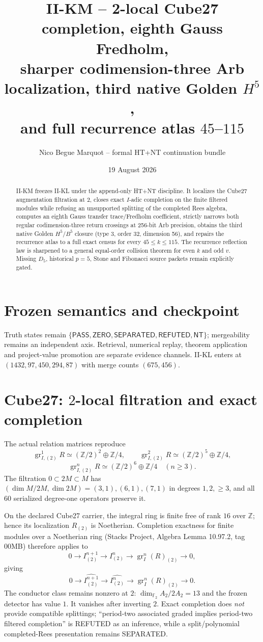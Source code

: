 \documentclass[9.5pt,a4paper]{article}
\title{\textbf{II-KM -- 2-local Cube27 completion, eighth Gauss Fredholm,}\\\textbf{sharper codimension-three Arb localization, third native Golden $H^5$,}\\\textbf{and full recurrence atlas $45$--$115$}}
\author{Nico Begue Marquot -- formal HT+NT continuation bundle}\date{19 August 2026}
\newcommand{\PASS}{\textsf{PASS}}\newcommand{\ZERO}{\textsf{ZERO}}\newcommand{\SEP}{\textsf{SEPARATED}}\newcommand{\REF}{\textsf{REFUTED}}\newcommand{\NT}{\textsf{NT}}
\begin{document}
\maketitle\vspace{-1.25em}
\begin{abstract}\small
II-KM freezes II-KL under the append-only HT+NT discipline.  It localizes the Cube27 augmentation filtration at $2$, closes exact $I$-adic completion on the finite filtered modules while refusing an unsupported splitting of the completed Rees algebra, computes an eighth Gauss transfer trace/Fredholm coefficient, strictly narrows both regular codimension-three return crossings at 256-bit Arb precision, obtains the third native Golden $H^5/B^5$ closure (type 3, order 32, dimension 56), and repairs the recurrence atlas to a full exact census for every $45\le k\le115$.  The recurrence reflection law is sharpened to a general equal-order collision theorem for even $k$ and odd $v$.  Missing $D_5$, historical $p=5$, Stone and Fibonacci source packets remain explicitly gated.
\end{abstract}
\section{Frozen semantics and checkpoint}
Truth states remain $\{\PASS,\ZERO,\SEP,\REF,\NT\}$; mergeability remains an independent axis.  Retrieval, numerical replay, theorem application and project-value promotion are separate evidence channels.  II-KL enters at $(1432,97,450,294,87)$ with merge counts $(675,456)$.

\section{Cube27: $2$-local filtration and exact completion}
The actual relation matrices reproduce
\[
\operatorname{gr}^1_{I,(2)}R\simeq(\mathbb Z/2)^2\oplus\mathbb Z/4,\qquad
\operatorname{gr}^2_{I,(2)}R\simeq(\mathbb Z/2)^5\oplus\mathbb Z/4,
\]
\[
\boxed{\operatorname{gr}^n_{I,(2)}R\simeq(\mathbb Z/2)^6\oplus\mathbb Z/4\quad(n\ge3).}
\]
The filtration $0\subset2M\subset M$ has $(\dim M/2M,\dim 2M)=(3,1),(6,1),(7,1)$ in degrees $1,2,\ge3$, and all $60$ serialized degree-one operators preserve it.

On the declared Cube27 carrier, the integral ring is finite free of rank $16$ over $\mathbb Z$; hence its localization $R_{(2)}$ is Noetherian.  Completion exactness for finite modules over a Noetherian ring (Stacks Project, Algebra Lemma 10.97.2, tag 00MB) therefore applies to
\[
0\to I^{n+1}_{(2)}\to I^n_{(2)}\to\operatorname{gr}^n_I(R)_{(2)}\to0,
\]
giving
\[
\boxed{0\to\widehat{I^{n+1}_{(2)}}\to\widehat{I^n_{(2)}}\to\operatorname{gr}^n_I(R)_{(2)}\to0.}
\]
The conductor class remains nonzero at $2$: $\dim_{\mathbb F_2}A_2/2A_2=13$ and the frozen detector has value $1$.  It vanishes after inverting $2$.  Exact completion does \emph{not} provide compatible splittings; ``period-two associated graded implies period-two filtered completion'' is \REF{} as an inference, while a split/polynomial completed-Rees presentation remains \SEP.
\end{document}
